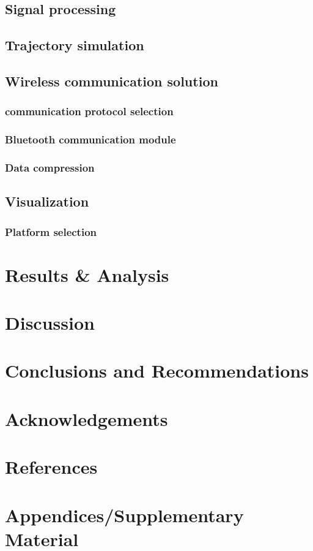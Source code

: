 \subsection{Signal processing}

\subsection{Trajectory simulation}

\subsection{Wireless communication solution}

\subsubsection{communication protocol selection}


\subsubsection{Bluetooth communication module}


\subsubsection{Data compression}




\subsection{Visualization}
\subsubsection{Platform selection}





\section{Results \& Analysis}


\section{Discussion}


\section{Conclusions and Recommendations}


\section{Acknowledgements }


\section{References}


\printbibliography[heading=none]


\section{Appendices/Supplementary Material}




